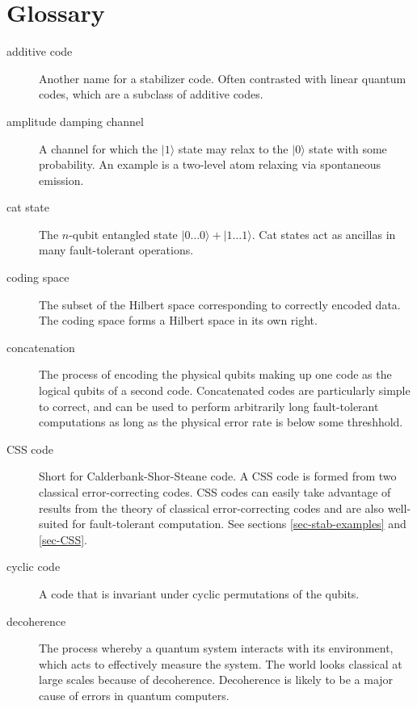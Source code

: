 \documentclass{report}
\newcommand{\ket}[1]{|{#1}\rangle}
\begin{document}
\chapter{Glossary}
\label{app-glossary}

\begin{description}

\item[additive code] Another name for a stabilizer code.  Often contrasted
with linear quantum codes, which are a subclass of additive codes.

\item[amplitude damping channel] A channel for which the $\ket{1}$ state
may relax to the $\ket{0}$ state with some probability.  An example is
a two-level atom relaxing via spontaneous emission.

\item[cat state] The $n$-qubit entangled state $\ket{0 \ldots 0} + \ket{1
\ldots 1}$.  Cat states act as ancillas in many fault-tolerant operations.

\item[coding space] The subset of the Hilbert space corresponding to correctly
encoded data.  The coding space forms a Hilbert space in its own right. 

\item[concatenation] The process of encoding the physical qubits making
up one code as the logical qubits of a second code.  Concatenated codes
are particularly simple to correct, and can be used to perform arbitrarily
long fault-tolerant computations as long as the physical error rate is
below some threshhold.

\item[CSS code] Short for Calderbank-Shor-Steane code.  A CSS code is formed
from two classical error-correcting codes.  CSS codes can easily take
advantage of results from the theory of classical error-correcting codes
and are also well-suited for fault-tolerant computation.  See sections
\ref{sec-stab-examples} and \ref{sec-CSS}. 

\item[cyclic code] A code that is invariant under cyclic permutations of
the qubits.

\item[decoherence] The process whereby a quantum system interacts with its
environment, which acts to effectively measure the system.  The world looks
classical at large scales because of decoherence.  Decoherence is likely to
be a major cause of errors in quantum computers.


\end{description}
\end{document}
